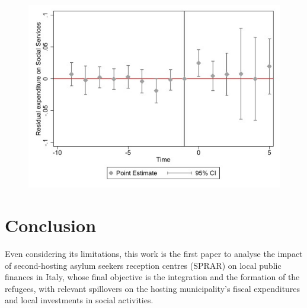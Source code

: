 \documentclass[authoryear,preprint,review,12pt]{elsarticle}
\begin{document}
\begin{figure}[H]
    \includegraphics[scale = 0.5]{images/residual event dd.jpg}
\label{fig3}
\end{figure}


\section{Conclusion}

\noindent
Even considering its limitations, this work is the first paper to analyse the impact of second-hosting asylum seekers reception centres (SPRAR) on local public finances in Italy, whose final objective is the integration and the formation of the refugees, with relevant spillovers on the hosting municipality's fiscal expenditures and local investments in social activities.\\ 


\end{document}
